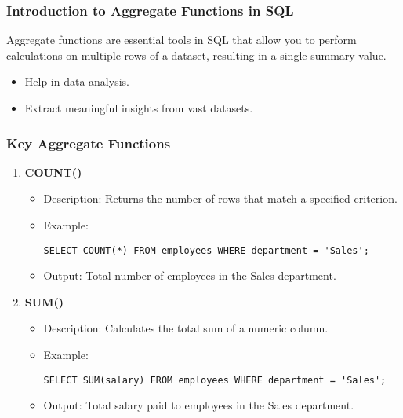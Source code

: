 \documentclass[aspectratio=169]{beamer}
\begin{document}
\begin{frame}[fragile]
    \frametitle{Introduction to Aggregate Functions in SQL}
    Aggregate functions are essential tools in SQL that allow you to perform calculations on multiple rows of a dataset, resulting in a single summary value. 
    \begin{itemize}
        \item Help in data analysis.
        \item Extract meaningful insights from vast datasets.
    \end{itemize}
\end{frame}

\begin{frame}[fragile]
    \frametitle{Key Aggregate Functions}
    \begin{enumerate}
        \item \textbf{COUNT()}
            \begin{itemize}
                \item Description: Returns the number of rows that match a specified criterion.
                \item Example:
                \begin{lstlisting}
SELECT COUNT(*) FROM employees WHERE department = 'Sales';
                \end{lstlisting}
                \item Output: Total number of employees in the Sales department.
            \end{itemize}
        
        \item \textbf{SUM()}
            \begin{itemize}
                \item Description: Calculates the total sum of a numeric column.
                \item Example:
                \begin{lstlisting}
SELECT SUM(salary) FROM employees WHERE department = 'Sales';
                \end{lstlisting}
                \item Output: Total salary paid to employees in the Sales department.
            \end{itemize}
    \end{enumerate}
\end{frame}
\end{document}
